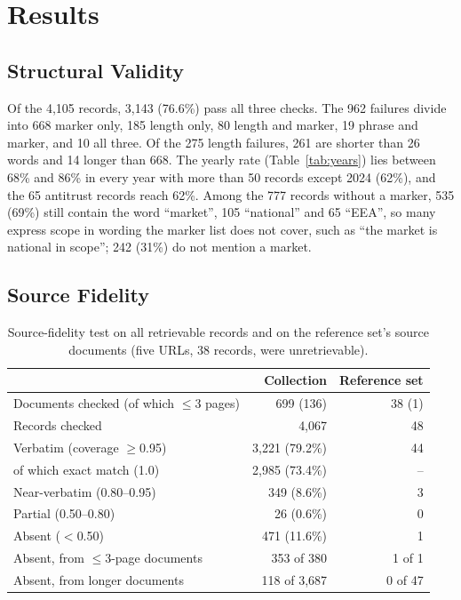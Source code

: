 \documentclass{IOS-Book-Article}
\begin{document}
\section{Results}
\label{sec:results}

\subsection{Structural Validity}

Of the 4,105 records, 3,143 (76.6\%) pass all three checks. The 962 failures
divide into 668 marker only, 185 length only, 80 length and marker, 19 phrase
and marker, and 10 all three. Of the 275 length failures, 261 are shorter than
26 words and 14 longer than 668. The yearly rate (Table~\ref{tab:years}) lies
between 68\% and 86\% in every year with more than 50 records except 2024
(62\%), and the 65 antitrust records reach 62\%. Among the 777 records without a
marker, 535 (69\%) still contain the word ``market'', 105 ``national'' and 65
``EEA'', so many express scope in wording the marker list does not cover, such
as ``the market is national in scope''; 242 (31\%) do not mention a market.

\subsection{Source Fidelity}

\begin{table}[t]
\caption{Source-fidelity test on all retrievable records and on the reference
set's source documents (five URLs, 38 records, were unretrievable).}
\label{tab:fidelity}
\small
\centering
\begin{tabular}{lrr}
\toprule
 & Collection & Reference set\\
\midrule
Documents checked (of which $\le$3 pages) & 699 (136) & 38 (1)\\
Records checked & 4,067 & 48\\
Verbatim (coverage $\ge$0.95) & 3,221 (79.2\%) & 44\\
\quad of which exact match (1.0) & 2,985 (73.4\%) & --\\
Near-verbatim (0.80--0.95) & 349 (8.6\%) & 3\\
Partial (0.50--0.80) & 26 (0.6\%) & 0\\
Absent ($<$0.50) & 471 (11.6\%) & 1\\
Absent, from $\le$3-page documents & 353 of 380 & 1 of 1\\
Absent, from longer documents & 118 of 3,687 & 0 of 47\\
\bottomrule
\end{tabular}
\end{table}
\end{document}

